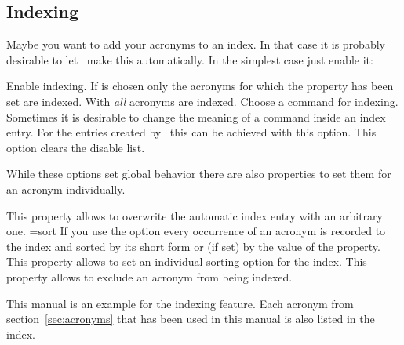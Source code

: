 \documentclass{acro-manual}
\begin{document}
\subsection{Indexing}\label{sec:indexing}
Maybe you want to add your acronyms to an index. In that case it is probably
desirable to let \acro\ make this automatically.  In the simplest case just
enable it:
\begin{options}
    Enable indexing.  If  is chosen only the
    acronyms for which the property  has been set are indexed.
    With  \emph{all} acronyms are indexed.
    Choose a command for indexing.
    Sometimes it is desirable to change the meaning of a command inside an
    index entry.  For the entries created by \acro\ this can be achieved with
    this option.
    This option clears the disable list.
\end{options}
While these options set global behavior there are also properties to set them
for an acronym individually.
\begin{properties}
  \Default
    This property allows to overwrite the automatic index entry with an
    arbitrary one.
  \Default={sort}
    If you use the option  every occurrence of an acronym is
    recorded to the index and sorted by its short form or (if set) by the
    value of the  property.  This property allows to set an
    individual sorting option for the index.
    This property allows to exclude an acronym from being indexed.
\end{properties}
This manual is an example for the indexing feature.  Each acronym from
section~\vref{sec:acronyms} that has been used in this manual is also listed
in the index.

\end{document}
